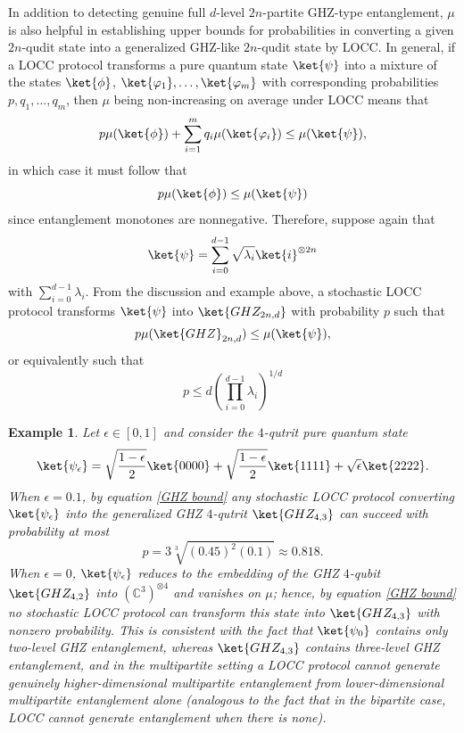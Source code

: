 \documentclass{article}
\newtheorem{eg}{Example}
\begin{document}
In addition to detecting genuine full $d$-level $2n$-partite GHZ-type entanglement, $\mu$ is also helpful in establishing upper bounds for probabilities in converting a given $2n$-qudit state into a generalized GHZ-like $2n$-qudit state by LOCC. In general, if a LOCC protocol transforms a pure quantum state $\ket{\psi}$ into a mixture of the states $\ket{\phi}$, $\ket{\varphi_1},\dots,\ket{\varphi_m}$ with corresponding probabilities $p,q_1,\dots,q_m$, then $\mu$ being non-increasing on average under LOCC means that 
\[p\mu(\ket{\phi})+\sum\limits_{i=1}^mq_i\mu(\ket{\varphi_i}) \leq \mu(\ket{\psi}),\]
in which case it must follow that 
\[p\mu(\ket{\phi})\leq \mu(\ket{\psi})\]
since entanglement monotones are nonnegative. Therefore, suppose again that 
\[\ket{\psi} = \sum\limits_{i=0}^{d-1}\sqrt{\lambda_i}\ket{i}^{\otimes 2n}\]
with $\sum\limits_{i=0}^{d-1}\lambda_i$. 
From the discussion and example above, 
a stochastic LOCC protocol transforms $\ket{\psi}$ into $\ket{GHZ_{2n,d}}$ with probability $p$ such that 
\[p\mu(\ket{GHZ}_{2n,d}) \leq \mu(\ket{\psi}),\]
or equivalently such that 
\begin{equation}\label{GHZ bound}
    p \leq d\left(\prod\limits_{i=0}^{d-1}\lambda_i\right)^{1/d}
\end{equation}
\begin{eg}
    Let $\epsilon\in [0,1]$ and consider the $4$-qutrit pure quantum state
    \[\ket{\psi_{\epsilon}} = \sqrt{\frac{1-\epsilon}{2}}\ket{0000}+\sqrt{\frac{1-\epsilon}{2}}\ket{1111}+\sqrt{\epsilon}\ket{2222}.\]
    When $\epsilon=0.1$, by equation \eqref{GHZ bound} any stochastic LOCC protocol converting $\ket{\psi_{\epsilon}}$ into the generalized GHZ $4$-qutrit $\ket{GHZ_{4,3}}$ can succeed with probability at most 
    \[p = 3\sqrt[3]{(0.45)^2(0.1)}\approx 0.818.\] 
    When $\epsilon=0$, $\ket{\psi_{\epsilon}}$ reduces to the embedding of the GHZ $4$-qubit $\ket{GHZ_{4,2}}$ into $(\mathbb{C}^3)^{\otimes 4}$ and vanishes on $\mu$; hence, by equation \eqref{GHZ bound} no stochastic LOCC protocol can transform this state into $\ket{GHZ_{4,3}}$ with nonzero probability. This is consistent with the fact that $\ket{\psi_0}$ contains only two-level GHZ entanglement, whereas $\ket{GHZ_{4,3}}$ contains three-level GHZ entanglement, and in the multipartite setting a LOCC protocol cannot generate genuinely higher-dimensional multipartite entanglement from lower-dimensional multipartite entanglement alone \cite{huber2013structure} (analogous to the fact that in the bipartite case, LOCC cannot generate entanglement when there is none). 
\end{eg}
\end{document}
